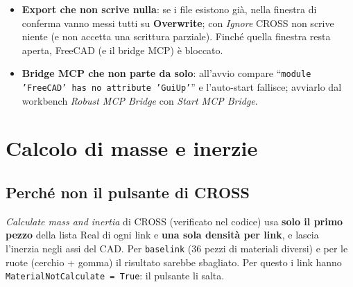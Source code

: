 \documentclass[11pt,a4paper]{article}
\renewcommand{\_}{\oldunderscore\allowbreak}
\begin{document}
\begin{itemize}[leftmargin=*]
    \texttt{G:\textbackslash robotTest}. La cartella di uscita \`e solo l'\textbf{OutputPath} del robot.
  \item \textbf{Export che non scrive nulla}: se i file esistono gi\`a, nella finestra di conferma vanno
    messi tutti su \textbf{Overwrite}; con \emph{Ignore} CROSS non scrive niente (e non accetta una
    scrittura parziale). Finch\'e quella finestra resta aperta, FreeCAD (e il bridge MCP) \`e bloccato.
  \item \textbf{Bridge MCP che non parte da solo}: all'avvio compare
    ``\texttt{module 'FreeCAD' has no attribute 'GuiUp'}'' e l'auto-start fallisce; avviarlo dal
    workbench \emph{Robust MCP Bridge} con \emph{Start MCP Bridge}.
\end{itemize}

\section{Calcolo di masse e inerzie}\label{sec:masse}
\subsection{Perch\'e non il pulsante di CROSS}
\emph{Calculate mass and inertia} di CROSS (verificato nel codice) usa \textbf{solo il primo pezzo} della
lista Real di ogni link e \textbf{una sola densit\`a per link}, e lascia l'inerzia negli assi del CAD. Per
\texttt{base\_link} (36 pezzi di materiali diversi) e per le ruote (cerchio + gomma) il risultato sarebbe
sbagliato. Per questo i link hanno \texttt{MaterialNotCalculate = True}: il pulsante li salta.
\end{document}

